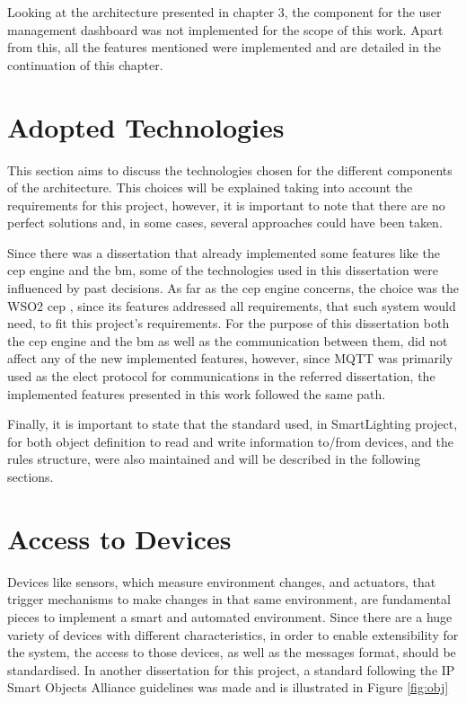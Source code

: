 Looking at the architecture presented in chapter 3, the component for the user management dashboard was not implemented for the scope of this work. Apart from this, all the features mentioned were implemented and are detailed in the continuation of this chapter.



\section{Adopted  Technologies}
\label{implementation:technologies}

This section aims to discuss the technologies chosen for the different components of the architecture. This choices will be explained taking into account the requirements for this project, however, it is important to note that there are no perfect solutions and, in some cases, several approaches could have been taken.

Since there was a dissertation that already implemented some features like the \ac{cep} engine and the \ac{bm}, some of the technologies used in this dissertation were influenced by past decisions. As far as the \ac{cep} engine concerns, the choice was the WSO2 \ac{cep} \cite{wso2}, since its features addressed all requirements, that such system would need, to fit this project's requirements. For the purpose of this dissertation both the \ac{cep} engine and the \ac{bm} as well as the communication between them, did not affect any of the new implemented features, however, since MQTT was primarily used as the elect protocol for communications in the referred dissertation, the implemented features presented in this work followed the same path.

Finally, it is important to state that the standard used, in SmartLighting project, for both object definition to read and write information to/from devices, and the rules structure, were also maintained and will be described in the following sections. 

\section{Access to Devices}
\label{implementation:devices}

Devices like sensors, which measure environment changes, and actuators, that trigger mechanisms to make changes in that same environment, are fundamental pieces to implement a smart and automated environment. Since there are a huge variety of devices with different characteristics, in order to enable extensibility for the system, the access to those devices, as well as the messages format, should be standardised. In another dissertation for this project, a standard following the IP Smart Objects Alliance guidelines was made and is illustrated in Figure \ref{fig:obj}

